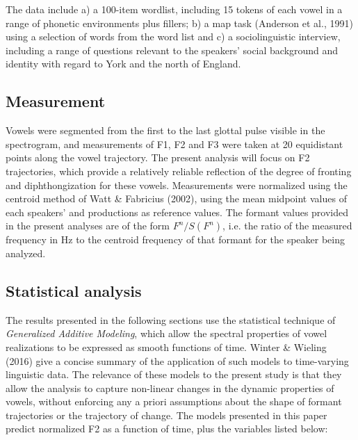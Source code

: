 \documentclass[12pt]{article}
\begin{document}
The data include a) a 100-item wordlist, including 15 tokens of each vowel in a range of phonetic environments plus fillers; b) a map task (Anderson et al., 1991) using a selection of words from the word list and c) a sociolinguistic interview, including a range of questions relevant to the speakers' social background and identity with regard to York and the north of England. 

\subsection{Measurement}

Vowels were segmented from the first to the last glottal pulse visible in the spectrogram, and measurements of F1, F2 and F3 were taken at 20 equidistant points along the vowel trajectory. The present analysis will focus on F2 trajectories, which provide a relatively reliable reflection of the degree of fronting and diphthongization for these vowels. Measurements were normalized using the centroid method of Watt \& Fabricius (2002), using the mean midpoint values of each speakers'  and  productions as reference values. The formant values provided in the present analyses are of the form $F^n/S (F^n)$, i.e. the ratio of the measured frequency in Hz to the centroid frequency of that formant for the speaker being analyzed.

\subsection{Statistical analysis}

The results presented in the following sections use the statistical technique of \textit{Generalized Additive Modeling}, which allow the spectral properties of vowel realizations to be expressed as smooth functions of time. Winter \& Wieling (2016) give a concise summary of the application of such models to time-varying linguistic data. The relevance of these models to the present study is that they allow the analysis to capture non-linear changes in the dynamic properties of vowels, without enforcing any a priori assumptions about the shape of formant trajectories or the trajectory of change. The models presented in this paper predict normalized F2 as a function of time, plus the variables listed below:
\end{document}
